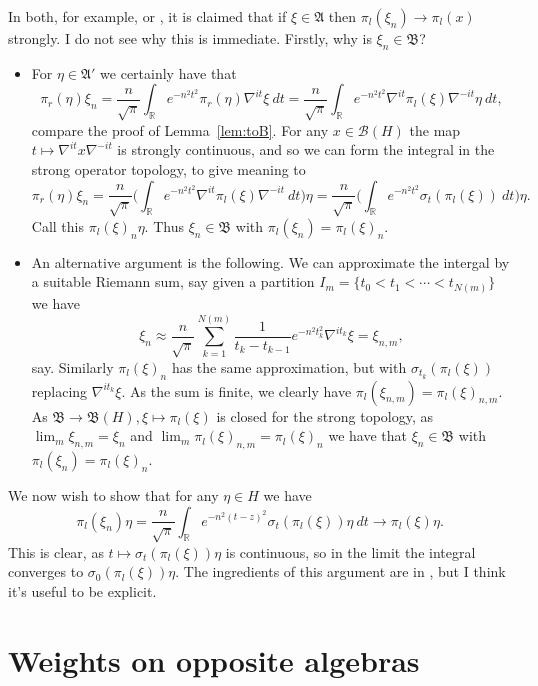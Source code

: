 \documentclass[a4paper,11pt]{article}
\theoremstyle{plain}
\theoremstyle{remark}
\newcommand{\mc}[1]{\mathcal{#1}}
\newcommand{\mf}[1]{\mathfrak{#1}}
\begin{document}
In both, for example, \cite[Proof of Theorem~VI.2.2]{TakesakiII} or \cite[Page~303]{StratilaZsido}, it is claimed that if $\xi\in\mf A$ then $\pi_l(\xi_n) \to \pi_l(x)$ strongly.  I do not see why this is immediate.  Firstly, why is $\xi_n\in\mf B$?
\begin{itemize}
\item For $\eta\in\mf A'$ we certainly have that
\[ \pi_r(\eta) \xi_n = \frac{n}{\sqrt\pi} \int_{\mathbb R} e^{-n^2t^2} \pi_r(\eta) \nabla^{it}\xi \ dt 
= \frac{n}{\sqrt\pi} \int_{\mathbb R} e^{-n^2t^2} \nabla^{it}\pi_l(\xi) \nabla^{-it}\eta \ dt, \]
compare the proof of Lemma~\ref{lem:toB}.  For any $x\in\mc B(H)$ the map $t\mapsto \nabla^{it} x \nabla^{-it}$ is strongly continuous, and so we can form the integral in the strong operator topology, to give meaning to
\[ \pi_r(\eta) \xi_n
= \frac{n}{\sqrt\pi} \Big( \int_{\mathbb R} e^{-n^2t^2} \nabla^{it}\pi_l(\xi) \nabla^{-it} \ dt \Big) \eta
= \frac{n}{\sqrt\pi} \Big( \int_{\mathbb R} e^{-n^2t^2} \sigma_t(\pi_l(\xi)) \ dt \Big) \eta. \]
Call this $\pi_l(\xi)_n \eta$.  Thus $\xi_n\in\mf B$ with $\pi_l(\xi_n) = \pi_l(\xi)_n$.

\item An alternative argument is the following.  We can approximate the intergal by a suitable Riemann sum, say given a partition $I_m = \{ t_0 < t_1 < \cdots < t_{N(m)} \}$ we have
\[ \xi_n \approx \frac{n}{\sqrt\pi} \sum_{k=1}^{N(m)} \frac{1}{t_k-t_{k-1}} e^
{-n^2t_k^2} \nabla^{it_k} \xi = \xi_{n,m}, \]
say.  Similarly $\pi_l(\xi)_n$ has the same approximation, but with $\sigma_{t_k}(\pi_l(\xi))$ replacing $\nabla^{it_k}\xi$.  As the sum is finite, we clearly have $\pi_l(\xi_{n,m}) = \pi_l(\xi)_{n,m}$.  As $\mf B \to \mf B(H), \xi\mapsto\pi_l(\xi)$ is closed for the strong topology, as $\lim_m \xi_{n,m} = \xi_n$ and $\lim_m \pi_l(\xi)_{n,m} = \pi_l(\xi)_n$ we have that $\xi_n\in\mf B$ with $\pi_l(\xi_n) = \pi_l(\xi)_n$.
\end{itemize}
We now wish to show that for any $\eta\in H$ we have
\[ \pi_l(\xi_n)\eta = \frac{n}{\sqrt\pi} \int_{\mathbb R} e^{-n^2(t-z)^2} \sigma_t(\pi_l(\xi))\eta \ dt \to \pi_l(\xi)\eta. \]
This is clear, as $t\mapsto \sigma_t(\pi_l(\xi))\eta$ is continuous, so in the limit the integral converges to $\sigma_0(\pi_l(\xi))\eta$.  The ingredients of this argument are in \cite[Proof of Theorem~VI.2.2]{TakesakiII}, but I think it's useful to be explicit.


\section{Weights on opposite algebras}
\end{document}
